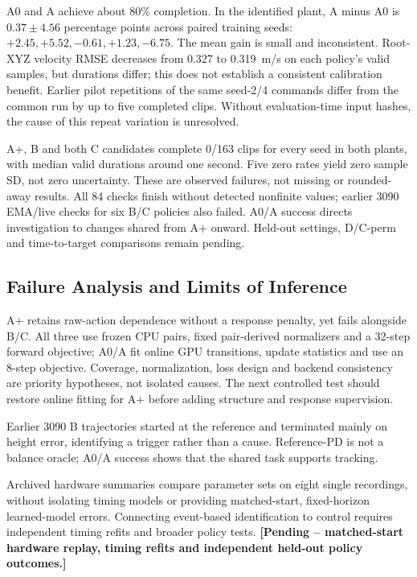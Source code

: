 \documentclass[letterpaper,10pt,conference]{ieeeconf}
\newcommand{\pending}[1]{\textcolor{red!65!black}{\textbf{[Pending -- #1]}}}
\begin{document}
A0 and A achieve about 80\% completion. In the identified plant, A minus A0 is $0.37\pm4.56$ percentage points across paired training seeds: $+2.45,+5.52,-0.61,+1.23,-6.75$. The mean gain is small and inconsistent. Root-XYZ velocity RMSE decreases from 0.327 to 0.319~m/s on each policy's valid samples, but durations differ; this does not establish a consistent calibration benefit. Earlier pilot repetitions of the same seed-2/4 commands differ from the common run by up to five completed clips. Without evaluation-time input hashes, the cause of this repeat variation is unresolved.

A+, B and both C candidates complete 0/163 clips for every seed in both plants, with median valid durations around one second. Five zero rates yield zero sample SD, not zero uncertainty. These are observed failures, not missing or rounded-away results. All 84 checks finish without detected nonfinite values; earlier 3090 EMA/live checks for six B/C policies also failed. A0/A success directs investigation to changes shared from A+ onward. Held-out settings, D/C-perm and time-to-target comparisons remain pending.

\subsection{Failure Analysis and Limits of Inference}
A+ retains raw-action dependence without a response penalty, yet fails alongside B/C. All three use frozen CPU pairs, fixed pair-derived normalizers and a 32-step forward objective; A0/A fit online GPU transitions, update statistics and use an 8-step objective. Coverage, normalization, loss design and backend consistency are priority hypotheses, not isolated causes. The next controlled test should restore online fitting for A+ before adding structure and response supervision.

Earlier 3090 B trajectories started at the reference and terminated mainly on height error, identifying a trigger rather than a cause. Reference-PD is not a balance oracle; A0/A success shows that the shared task supports tracking.

Archived hardware summaries compare parameter sets on eight single recordings, without isolating timing models or providing matched-start, fixed-horizon learned-model errors. Connecting event-based identification to control requires independent timing refits and broader policy tests. \pending{matched-start hardware replay, timing refits and independent held-out policy outcomes.}
\end{document}
